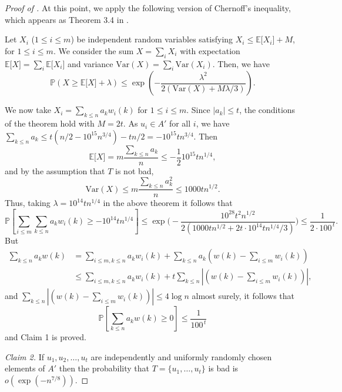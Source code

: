 \documentclass{toc}
\newcommand\E{\mathbb{E}}
\renewcommand\P{\mathbb{P}}
\begin{document}
\begin{proof}[Proof of ]
  At this point, we apply the following version of Chernoff's inequality, which appears as Theorem 3.4 in \cite{chunglu}.
  
  \smallskip
  
  Let $X_i$ ($1 \leq i \leq m$) be independent random variables
  satisfying $X_i \leq \E \lbrack X_i\rbrack + M$, for
  $1 \leq i \leq m$. We consider the sum $X=\sum_i X_i$ with
  expectation $\E\lbrack X\rbrack = \sum_i \E\lbrack X_i\rbrack$ and
  variance $\text{Var}(X) = \sum_i \text{Var}(X_i)$. Then, we have
  \[
    \P( X \geq \E\lbrack X\rbrack + \lambda) \leq
    \exp\left(-\frac{\lambda^2}{2(\text{Var}(X)+M\lambda/3)}\right).
  \]
  
  \smallskip
  
  We now take $X_i=\sum_{k\leq n} a_kw_i(k)$ for $1\leq i\leq
  m$. Since $|a_k|\leq t$, the conditions of the theorem hold with
  $M=2t$. As $u_i\in A'$ for all $i$, we have
  $\sum_{k\leq n} a_k\leq
  t(n/2-10^{15}n^{3/4})-tn/2=-10^{15}tn^{3/4}$. Then
  \[
    \E\lbrack X\rbrack=m\frac{\sum_{k\leq n} a_k}{n} \leq
    -\frac{1}{2}10^{15}tn^{1/4},
  \]
  and by the assumption that $T$ is not bad,
  \[
    \text{Var}(X)\leq m \frac{\sum_{k\leq n} a_k^2}{n}\leq
    1000tn^{1/2}.
  \]
  Thus, taking $\lambda=10^{14}tn^{1/4}$ in the above theorem it
  follows that
  \[
    \P\left\lbrack \sum_{i\leq m}\sum_{k\leq n} a_kw_i(k)\geq
  -10^{14}tn^{1/4}\right\rbrack \leq
  \exp\bigg(-\frac{10^{28}t^2n^{1/2}}{2(1000tn^{1/2}+2t\cdot10^{14}tn^{1/4}/3)}\bigg)\leq
  \frac{1}{2\cdot 100^{\,t}}.
\]
But
	\begin{align*}
	\sum_{k\leq n}a_kw(k) &= \sum_{i\leq m,k\leq n}a_kw_i(k)+\sum_{k\leq n}a_k(w(k)-\sum_{i\leq m}w_i(k)) \\
	&\leq \sum_{i\leq m,k\leq n}a_kw_i(k)+t\sum_{k\leq n}\left|(w(k)-\sum_{i\leq m}w_i(k))\right|,
	\end{align*} and $\sum_{k\leq n}|(w(k)-\sum_{i\leq m}w_i(k))|\leq 4\log n$ almost surely, it follows that
        \[
   \mathbb{P} \left\lbrack\sum_{k\leq n}a_kw(k)\geq 0 \right\rbrack\leq \frac{1}{100^{\,t}}
        \]
        and Claim 1 is proved.
	
	\smallskip
	
	\noindent \emph{Claim 2.} If $u_1,u_2,\dots,u_t$ are independently and uniformly randomly chosen elements of $A'$ then the probability that $T=\{u_1,\dots,u_t\}$ is bad is $o(\exp(-n^{7/8}))$.
	
	\smallskip
	

\end{proof}
\end{document}
